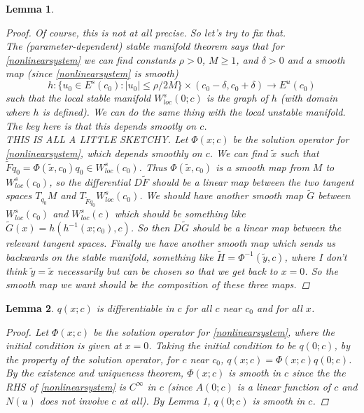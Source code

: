 \documentclass[12pt]{article}
\newtheorem{lemma}{Lemma}
\begin{document}
\begin{lemma}
\begin{proof}
Of course, this is not at all precise. So let's try to fix that.\\

The (parameter-dependent) stable manifold theorem says that for \eqref{nonlinearsystem} we can find constants $\rho > 0$, $M \geq 1$, and $\delta > 0$ and a smooth map (since \eqref{nonlinearsystem} is smooth) 
\[
h: \{ u_0 \in E^s(c_0) : |u_0| \leq \rho / 2M \} \times (c_0 - \delta, c_0 + \delta) \rightarrow E^u(c_0) 
\]
such that the local stable manifold $W^s_{loc}(0; c)$ is the graph of $h$ (with domain where $h$ is defined). We can do the same thing with the local unstable manifold. The key here is that this depends smootly on $c$.\\

THIS IS ALL A LITTLE SKETCHY. Let $\Phi(x; c)$ be the solution operator for \eqref{nonlinearsystem}, which depends smoothly on $c$. We can find $\tilde{x}$ such that $\tilde{F} q_0 = \Phi(\tilde{x}, c_0) q_0 \in W^s_{loc}(c_0)$. Thus $\Phi(\tilde{x}, c_0)$ is a smooth map from $M$ to $W^s_{loc}(c_0)$, so the differential $D\tilde{F}$ should be a linear map between the two tangent spaces $T_{q_0}M$ and $T_{\tilde{F} q_0} W^s_{loc}(c_0)$. We should have another smooth map $\tilde{G}$ between $W^s_{loc}(c_0)$ and $W^s_{loc}(c)$ which should be something like $\tilde{G}(x) = h( h^{-1}(x; c_0), c)$. So then $D\tilde{G}$ should be a linear map between the relevant tangent spaces. Finally we have another smooth map which sends us backwards on the stable manifold, something like $\tilde{H} = \Phi^{-1}(\tilde{y},c)$, where I don't think $\tilde{y} = \tilde{x}$ necessarily but can be chosen so that we get back to $x = 0$. So the smooth map we want should be the composition of these three maps.

\end{proof}
\end{lemma}

\begin{lemma}\label{qcexists}
$q(x; c)$ is differentiable in $c$ for all $c$ near $c_0$ and for all $x$. 
\begin{proof}
Let $\Phi(x; c)$ be the solution operator for \eqref{nonlinearsystem}, where the initial condition is given at $x = 0$. Taking the initial condition to be $q(0; c)$, by the property of the solution operator, for $c$ near $c_0$, $q(x; c) = \Phi(x; c)q(0; c)$.\\

By the existence and uniqueness theorem, $\Phi(x; c)$ is smooth in $c$ since the the RHS of \eqref{nonlinearsystem} is $C^\infty$ in $c$ (since $A(0; c)$ is a linear function of $c$ and $N(u)$ does not involve $c$ at all). By Lemma 1, $q(0; c)$ is smooth in $c$.
\end{proof}
\end{lemma}
\end{document}
